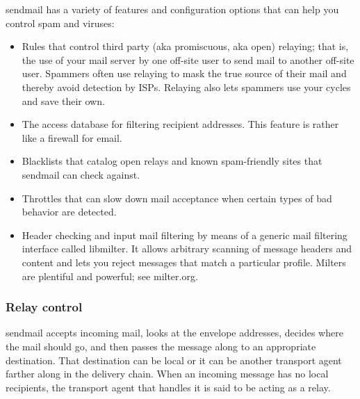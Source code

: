 {\protect\hypertarget{part0026_split_037.htmlux5cux23_idIndexMarker2559}{}{}}{sendmail}
has a variety of features and configuration options that can help you
control spam and viruses:

\begin{itemize}
\item
  Rules that control third party
  (\protect\hypertarget{part0026_split_037.htmlux5cux23_idIndexMarker2560}{}{}\protect\hypertarget{part0026_split_037.htmlux5cux23_idIndexMarker2561}{}{}aka
  promiscuous, aka open) relaying; that is, the use of your mail server
  by one off-site user to send mail to another off-site user. Spammers
  often use relaying to mask the true source of their mail and thereby
  avoid detection by ISPs. Relaying also lets spammers use {your} cycles
  and save their own.
\item
  The access database for filtering recipient addresses. This feature is
  rather like a firewall for email.
\item
  Blacklists that catalog open relays and known spam-friendly sites that
  {sendmail} can check against.
\item
  Throttles that can slow down mail acceptance when certain types of bad
  behavior are detected.
\item
  Header checking and input mail filtering by means of a generic mail
  filtering interface called {libmilter}. It allows arbitrary scanning
  of message headers and content and lets you reject messages that match
  a particular profile. Milters are plentiful and powerful; see
  milter.org.
\end{itemize}

\subsubsection[Relay
control]{\texorpdfstring{\protect\hypertarget{part0026_split_037.htmlux5cux23_idTextAnchor1093}{}{}Relay
control}{Relay control}}

\protect\hypertarget{part0026_split_037.htmlux5cux23_idIndexMarker2562}{}{}\protect\hypertarget{part0026_split_037.htmlux5cux23_idIndexMarker2563}{}{}{sendmail}
accepts incoming mail, looks at the envelope addresses, decides where
the mail should go, and then passes the message along to an appropriate
destination. That destination can be local or it can be another
transport agent farther along in the delivery chain. When an incoming
message has no local recipients, the transport agent that handles it is
said to be acting as a relay.

